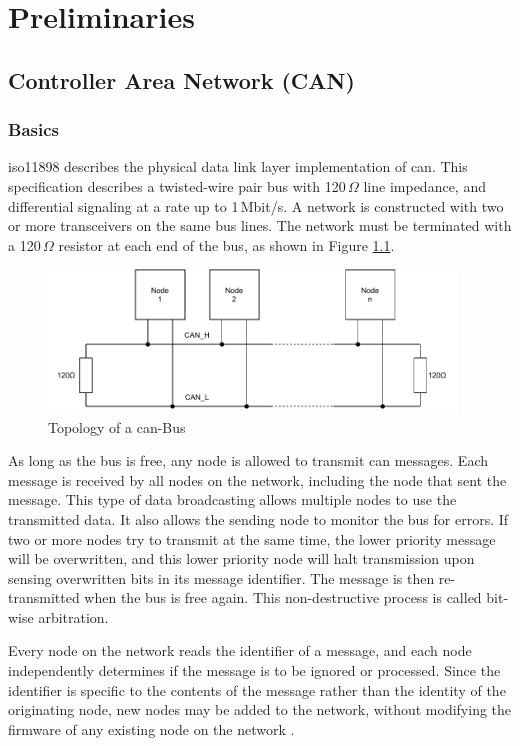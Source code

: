 \chapter{Preliminaries}
\section{Controller Area Network (CAN)}
\subsection{Basics}
\acrshort{iso}11898 describes the physical data link layer implementation of \acrshort{can}. This specification describes a twisted-wire pair bus with 120\,$\Omega$ line impedance, and differential signaling at a rate up to 1\,Mbit/s. A network is constructed with two or more transceivers on the same bus lines. The network must be terminated with a 120\,$\Omega$ resistor at each end of the bus, as shown in Figure \ref{fig:can-bus_topology}.

\begin{figure}[h!]
	\centering
	\includegraphics[height=3.8cm]{images/can-bus_topology}
	\caption{Topology of a \acrshort{can}-Bus}
	\label{fig:can-bus_topology}
\end{figure}

As long as the bus is free, any node is allowed to transmit \acrshort{can} messages. Each message is received by all nodes on the network, including the node that sent the message. This type of data broadcasting allows multiple nodes to use the transmitted data. It also allows the sending node to monitor the bus for errors. If two or more nodes try to transmit at the same time, the lower priority message will be overwritten, and this lower priority node will halt transmission upon sensing overwritten bits in its message identifier. The message is then re-transmitted when the bus is free again. This non-destructive process is called bit-wise arbitration.

Every node on the network reads the identifier of a message, and each node independently determines if the message is to be ignored or processed. Since the identifier is specific to the contents of the message rather than the identity of the originating node, new nodes may be added to the network, without modifying the firmware of any existing node on the network \cite{ti_can_transceivers}.
\newpage

